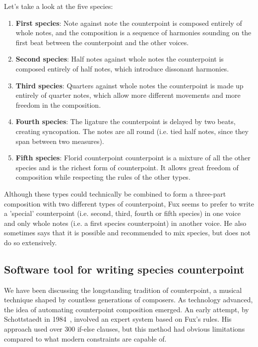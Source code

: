 Let's take a look at the five species:
\begin{enumerate}
    \item \textbf{First species}: Note against note \textendash{} the counterpoint is composed entirely of whole notes, and the composition is a sequence of harmonies sounding on the first beat between the counterpoint and the other voices.
    \item \textbf{Second species}: Half notes against whole notes \textendash{} the counterpoint is composed entirely of half notes, which introduce dissonant harmonies.
    \item \textbf{Third species}: Quarters against whole notes \textendash{} the counterpoint is made up entirely of quarter notes, which allow more different movements and more freedom in the composition.
    \item \textbf{Fourth species}: The ligature \textendash{} the counterpoint is delayed by two beats, creating syncopation. The notes are all round (i.e. tied half notes, since they span between two measures).
    \item \textbf{Fifth species}: Florid counterpoint \textendash{} counterpoint is a mixture of all the other species and is the richest form of counterpoint. It allows great freedom of composition while respecting the rules of the other types.
\end{enumerate}

Although these types could technically be combined to form a three-part composition with two different types of counterpoint, Fux seems to prefer to write a 'special' counterpoint (i.e. second, third, fourth or fifth species) in one voice and only whole notes (i.e. a first species counterpoint) in another voice. He also sometimes says that it is possible and recommended to mix species, but does not do so extensively.

\subsection{Software tool for writing species counterpoint}
We have been discussing the longstanding tradition of counterpoint, a musical technique shaped by countless generations of composers. As technology advanced, the idea of automating counterpoint composition emerged. An early attempt, by Schottstaedt in 1984~\cite{bill1984}, involved an expert system based on Fux's rules. His approach used over 300 if-else clauses, but this method had obvious limitations compared to what modern constraints are capable of.

